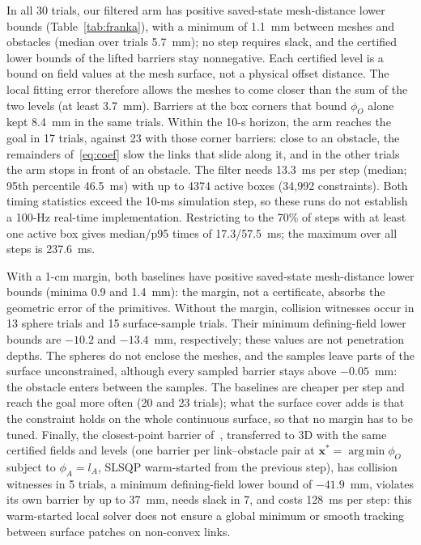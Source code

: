 \documentclass[journal]{IEEEtran}
\theoremstyle{definition}
\newcommand{\timeFrankaMed}{13.3}\newcommand{\timeFrankaPninetyfive}{46.5}
\DeclareMathOperator*{\argmin}{arg\,min}
\begin{document}
In all 30 trials, our filtered arm has positive saved-state mesh-distance lower bounds
(Table~\ref{tab:franka}), with a minimum of 1.1~mm between meshes and obstacles
(median over trials 5.7~mm); no step
requires slack, and the certified lower bounds of the lifted barriers stay nonnegative. Each certified
level is a bound on field values at the mesh surface, not a physical offset distance. The local
fitting error therefore allows the meshes to come closer than the sum of the two levels
(at least 3.7~mm). Barriers at the box corners that
bound $\phi_O$ alone kept 8.4~mm in the same trials. Within the 10-s horizon, the arm reaches the goal in 17 trials, against
23 with those corner barriers: close to an obstacle, the remainders of~\eqref{eq:coef} slow the links
that slide along it, and in the other trials the arm stops in front of an obstacle. The filter needs
\timeFrankaMed~ms per step (median; 95th percentile \timeFrankaPninetyfive~ms) with up to 4374 active
boxes (34{,}992 constraints). Both timing statistics exceed the 10-ms simulation step, so these
runs do not establish a 100-Hz real-time implementation.
Restricting to the 70\% of steps with at least one active box gives median/p95 times of
17.3/57.5~ms; the maximum over all steps is 237.6~ms.

With a 1-cm margin, both baselines have positive saved-state mesh-distance lower bounds
(minima 0.9 and 1.4~mm): the margin, not a certificate, absorbs the geometric error of the
primitives. Without the margin, collision witnesses occur in 13 sphere trials and 15 surface-sample
trials. Their minimum defining-field lower bounds are $-10.2$ and $-13.4$~mm, respectively;
these values are not penetration depths. The spheres do not enclose the meshes, and the samples
leave parts of the surface unconstrained,
although every sampled barrier stays above $-0.05$~mm: the obstacle enters between the samples. The baselines are
cheaper per step and reach the goal more often (20 and 23 trials); what the surface cover adds is
that the constraint holds on the whole continuous surface, so that no margin has to be tuned.
Finally, the closest-point barrier of~\cite{jo2026geometry}, transferred to 3D with the same
certified fields and levels (one barrier per link--obstacle pair at
$\mathbf x^\ast=\argmin\phi_O$ subject to $\phi_A=l_A$, SLSQP warm-started from the previous step),
has collision witnesses in 5 trials, a minimum defining-field lower bound of $-41.9$~mm,
violates its own barrier by up to 37~mm, needs slack in 7, and costs 128~ms per step:
this warm-started local solver does not ensure a global minimum or smooth tracking between
surface patches on non-convex links.
\end{document}
